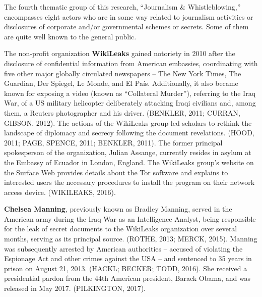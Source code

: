 The fourth thematic group of this research, ``Journalism \& Whistleblowing,'' encompasses eight actors who are in some way related to journalism activities or disclosures of corporate and/or governmental schemes or secrets. Some of them are quite well known to the general public.

The non-profit organization \textbf{WikiLeaks} gained notoriety in 2010 after the disclosure of confidential information from American embassies, coordinating with five other major globally circulated newspapers -- The New York Times, The Guardian, Der Spiegel, Le Monde, and El País. Additionally, it also became known for exposing a video (known as ``Collateral Murder''), referring to the Iraq War, of a US military helicopter deliberately attacking Iraqi civilians and, among them, a Reuters photographer and his driver. (BENKLER, 2011; CURRAN, GIBSON, 2012). The actions of the WikiLeaks group led scholars to rethink the landscape of diplomacy and secrecy following the document revelations. (HOOD, 2011; PAGE, SPENCE, 2011; BENKLER, 2011). The former principal spokesperson of the organization, Julian Assange, currently resides in asylum at the Embassy of Ecuador in London, England. The WikiLeaks group's website on the Surface Web provides details about the Tor software and explains to interested users the necessary procedures to install the program on their network access device. (WIKILEAKS, 2016).

\textbf{Chelsea Manning}, previously known as Bradley Manning, served in the American army during the Iraq War as an Intelligence Analyst, being responsible for the leak of secret documents to the WikiLeaks organization over several months, serving as its principal source. (ROTHE, 2013; MERCK, 2015). Manning was subsequently arrested by American authorities -- accused of violating the Espionage Act and other crimes against the USA -- and sentenced to 35 years in prison on August 21, 2013. (HACKL; BECKER; TODD, 2016). She received a presidential pardon from the 44th American president, Barack Obama, and was released in May 2017. (PILKINGTON, 2017).

